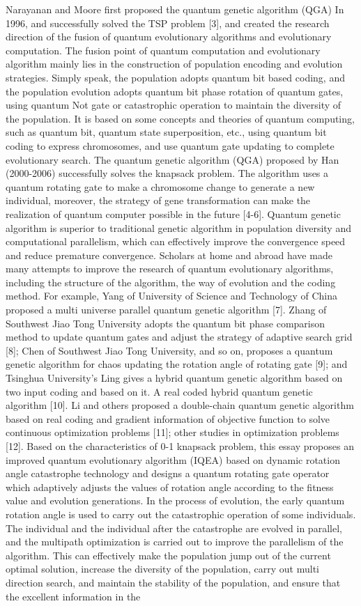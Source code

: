 \documentclass[10pt]{article}
\begin{document}
Narayanan and Moore first proposed the quantum genetic algorithm (QGA) In 1996, and successfully solved the TSP problem [3], and created the research direction of the fusion of quantum evolutionary algorithms and evolutionary computation. The fusion point of quantum computation and evolutionary algorithm mainly lies in the construction of population encoding and evolution strategies. Simply speak, the population adopts quantum bit based coding, and the population evolution adopts quantum bit phase rotation of quantum gates, using quantum Not gate or catastrophic operation to maintain the diversity of the population. It is based on some concepts and theories of quantum computing, such as quantum bit, quantum state superposition, etc., using quantum bit coding to express chromosomes, and use quantum gate updating to complete evolutionary search. The quantum genetic algorithm (QGA) proposed by Han (2000-2006) successfully solves the knapsack problem. The algorithm uses a quantum rotating gate to make a chromosome change to generate a new individual, moreover, the strategy of gene transformation can make the realization of quantum computer possible in the future [4-6]. Quantum genetic algorithm is superior to traditional genetic algorithm in population diversity and computational parallelism, which can effectively improve the convergence speed and reduce premature convergence. Scholars at home and abroad have made many attempts to improve the research of quantum evolutionary algorithms, including the structure of the algorithm, the way of evolution and the coding method. For example, Yang of University of Science and Technology of China proposed a multi universe parallel quantum genetic algorithm [7]. Zhang of Southwest Jiao Tong University adopts the quantum bit phase comparison method to update quantum gates and adjust the strategy of adaptive search grid [8]; Chen of Southwest Jiao Tong University, and so on, proposes a quantum genetic algorithm for chaos updating the rotation angle of rotating gate [9]; and Tsinghua University's Ling gives a hybrid quantum genetic algorithm based on two input coding and based on it. A real coded hybrid quantum genetic algorithm [10]. Li and others proposed a double-chain quantum genetic algorithm based on real coding and gradient information of objective function to solve continuous optimization problems [11]; other studies in optimization problems [12]. Based on the characteristics of 0-1 knapsack problem, this essay proposes an improved quantum evolutionary algorithm (IQEA) based on dynamic rotation angle catastrophe technology and designs a quantum rotating gate operator which adaptively adjusts the values of rotation angle according to the fitness value and evolution generations. In the process of evolution, the early quantum rotation angle is used to carry out the catastrophic operation of some individuals. The individual and the individual after the catastrophe are evolved in parallel, and the multipath optimization is carried out to improve the parallelism of the algorithm. This can effectively make the population jump out of the current optimal solution, increase the diversity of the population, carry out multi direction search, and maintain the stability of the population, and ensure that the excellent information in the 
\end{document}

